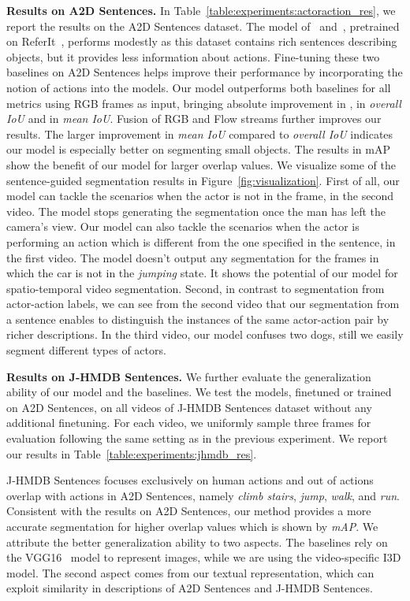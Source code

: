 \textbf{Results on A2D Sentences.} In Table~\ref{table:experiments:actoraction_res}, we report the results on the A2D Sentences dataset. 
The model of~\cite{hu2016segmentation} and~\cite{li2017tracking}, pretrained on ReferIt~\cite{sahar2014referit}, performs modestly as this dataset contains rich sentences describing objects, but it provides less information about actions. Fine-tuning these two baselines on A2D Sentences helps improve their performance by incorporating the notion of actions into the models. Our model outperforms both baselines for all metrics using RGB frames as input, bringing  absolute improvement in ,  in \textit{overall IoU} and  in \textit{mean IoU}. Fusion of RGB and Flow streams further improves our results. The larger improvement in \textit{mean IoU} compared to \textit{overall IoU} indicates our model is especially better on segmenting small objects. The results in mAP show the benefit of our model for larger overlap values. We visualize some of the sentence-guided segmentation results in Figure~\ref{fig:visualization}. First of all, our model can tackle the scenarios when the actor is not in the frame, \eg in the second video. The model stops generating the segmentation once the man has left the camera's view.  Our model can also tackle the scenarios when the actor is performing an action which is different from the one specified in the sentence, \eg in the first video. The model doesn't output any segmentation for the frames in which the car is not in the \textit{jumping} state. It shows the potential of our model for spatio-temporal video segmentation. Second, in contrast to segmentation from actor-action labels, we can see from the second video that our segmentation from a sentence enables to distinguish the instances of the same actor-action pair by richer descriptions. In the third video, our model confuses two dogs, still we easily segment different types of actors.

\textbf{Results on J-HMDB Sentences.} We further evaluate the generalization ability of our model and the baselines. We test the models, finetuned or trained on A2D Sentences, on all  videos of J-HMDB Sentences dataset without any additional finetuning. For each video, we uniformly sample three frames for evaluation following the same setting as in the previous experiment. We report our results in Table~\ref{table:experiments:jhmdb_res}.

J-HMDB Sentences focuses exclusively on human actions and  out of  actions overlap with actions in A2D Sentences, namely \textit{climb stairs}, \textit{jump}, \textit{walk}, and \textit{run}. 
Consistent with the results on A2D Sentences, our method provides a more accurate segmentation for higher overlap values which is shown by \textit{mAP}. We attribute the better generalization ability to two aspects. The baselines rely on the VGG16~\cite{simonyan2014very} model to represent images, while we are using the video-specific I3D model. The second aspect comes from our textual representation, which can exploit similarity in descriptions of A2D Sentences and J-HMDB Sentences.

